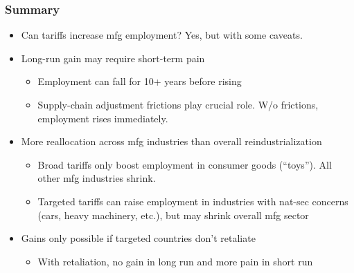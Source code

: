 \documentclass[aspectratio=169,t,10pt,table]{beamer}
\begin{document}
\begin{frame}
  \frametitle{Summary}
  \begin{itemize}\addtolength{\itemsep}{1ex}
  \item Can tariffs increase mfg employment? Yes, but with some caveats.
    \item Long-run gain may require short-term pain
    \begin{itemize}
    \item Employment can fall for 10+ years before rising
        \item Supply-chain adjustment frictions play crucial role. W/o frictions, employment rises immediately.
    \end{itemize}
      \item More reallocation across mfg industries than overall reindustrialization
      \begin{itemize}
      \item Broad tariffs only boost employment in consumer goods (``toys''). All other mfg industries shrink.
          \item Targeted tariffs can raise employment in industries with nat-sec concerns (cars, heavy machinery, etc.), but may shrink overall mfg sector
      \end{itemize}    
      \item Gains only possible if targeted countries don't retaliate
      \begin{itemize}
          \item With retaliation, no gain in long run and more pain in short run
      \end{itemize}
    \end{itemize}
\end{frame}
\end{document}
